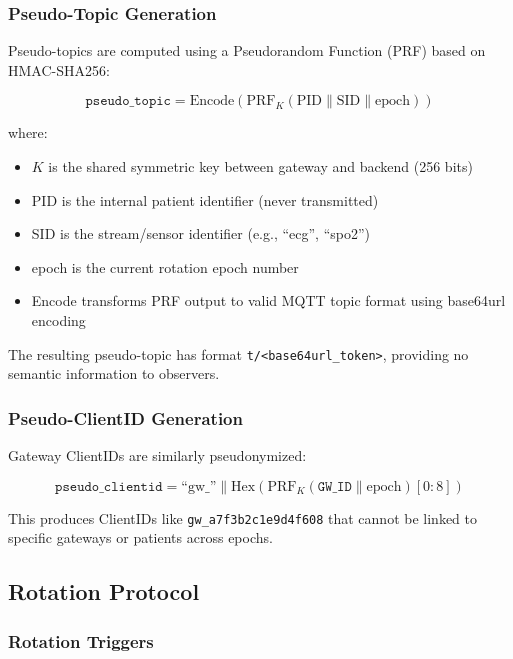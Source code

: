 \documentclass[conference]{IEEEtran}
\begin{document}
\subsubsection{Pseudo-Topic Generation}

Pseudo-topics are computed using a Pseudorandom Function (PRF) based on HMAC-SHA256:

\begin{equation}
\texttt{pseudo\_topic} = \text{Encode}(\text{PRF}_K(\text{PID} \| \text{SID} \| \text{epoch}))
\label{eq:prf}
\end{equation}

where:
\begin{itemize}
    \item $K$ is the shared symmetric key between gateway and backend (256 bits)
    \item PID is the internal patient identifier (never transmitted)
    \item SID is the stream/sensor identifier (e.g., ``ecg'', ``spo2'')
    \item epoch is the current rotation epoch number
    \item Encode transforms PRF output to valid MQTT topic format using base64url encoding
\end{itemize}

The resulting pseudo-topic has format \texttt{t/<base64url\_token>}, providing no semantic information to observers.

\subsubsection{Pseudo-ClientID Generation}

Gateway ClientIDs are similarly pseudonymized:

\begin{equation}
\texttt{pseudo\_clientid} = \text{``gw\_''} \| \text{Hex}(\text{PRF}_K(\texttt{GW\_ID} \| \text{epoch})[0{:}8])
\label{eq:clientid}
\end{equation}

This produces ClientIDs like \texttt{gw\_a7f3b2c1e9d4f608} that cannot be linked to specific gateways or patients across epochs.

\subsection{Rotation Protocol}

\subsubsection{Rotation Triggers}
\end{document}
